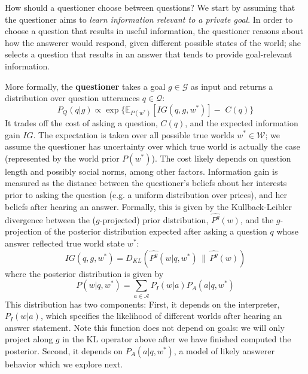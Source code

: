 \documentclass[12pt, floatsintext, jou]{apa6}
\begin{document}
How should a questioner choose between questions?
%
We start by assuming that the questioner aims to \emph{learn information relevant to a private goal}.
%
In order to choose a question that results in useful information, the questioner reasons about how the answerer would respond, given different possible states of the world; she selects a question that results in an answer that tends to provide goal-relevant information.
%




\newcommand{\KL}[2]{\ensuremath{D_{KL}({#1}\, \| \, {#2})}}
\newcommand{\E}[2]{\ensuremath{\mathbb{E}_{#1}\left [#2 \right]}}

More formally, the \textbf{questioner} takes a goal $g \in \mathcal{G}$ as input and returns a distribution over question utterances $q \in \mathcal{Q}$:
%
$$ 
P_{Q}(q|g)  \propto \exp\{\E{P(w^*)}{IG(q,g,w^*)} - \,\,C(q)\}
$$
%
It trades off the cost of asking a question, $C(q)$, and the expected information gain $IG$. The expectation is taken over all possible true worlds $w^* \in \mathcal{W}$; we assume the questioner has uncertainty over which true world is actually the case (represented by the world prior $P(w^*)$). The cost likely depends on question length and possibly social norms, among other factors. Information gain is measured as the distance between the questioner's beliefs about her interests prior to asking the question (e.g. a uniform distribution over prices), and her beliefs after hearing an answer. Formally, this is given by the Kullback-Leibler divergence between the ($g$-projected) prior distribution, $\widehat{P^g}(w)$, and the $g$-projection of the posterior distribution expected after asking a question $q$ whose answer reflected true world state $w^*$:
%
$$IG(q,g,w^*) = \KL{\widehat{P^g}(w|q, w^*)}{\widehat{P^g}(w)}$$
where the posterior distribution is given by
$$P(w|q, w^*) = \sum_{a \in \mathcal{A}} P_I(w | a) P_{A}(a| q, w^*)$$
%
This distribution has two components: 
First, it depends on the interpreter, $P_I(w | a)$, which specifies the likelihood of different worlds after hearing an answer statement. Note this function does not depend on goals: we will only project along $g$ in the KL operator above after we have finished computed the posterior. Second, it depends on $P_{A}(a | q, w^*)$, a model of likely answerer behavior which we explore next.
\end{document}
